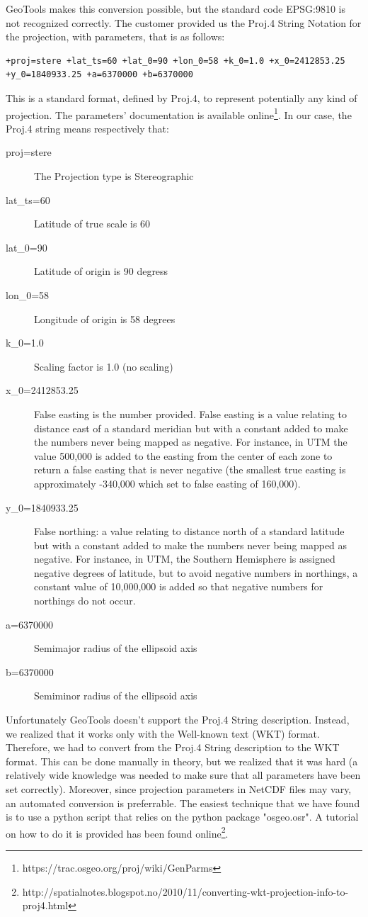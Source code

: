 \documentclass[11pt,a4paper,titlepage,oneside]{report}
\begin{document}
GeoTools makes this conversion possible, but the standard code EPSG:9810 is not recognized correctly. 
The customer provided us the Proj.4 String Notation for the projection, with parameters, that is as follows:
\begin{lstlisting}
+proj=stere +lat_ts=60 +lat_0=90 +lon_0=58 +k_0=1.0 +x_0=2412853.25 +y_0=1840933.25 +a=6370000 +b=6370000
\end{lstlisting}
This is a standard format, defined by Proj.4, to represent potentially any kind of projection. The parameters' documentation is available online\footnote{https://trac.osgeo.org/proj/wiki/GenParms}. In our case, the Proj.4 string means respectively that:
\begin{description}
\item[proj=stere] The Projection type is Stereographic
\item[lat\_ts=60] Latitude of true scale is 60
\item[lat\_0=90] Latitude of origin is 90 degress
\item[lon\_0=58] Longitude of origin is 58 degrees
\item[k\_0=1.0] Scaling factor is 1.0 (no scaling)
\item[x\_0=2412853.25] False easting is the number provided. False easting is a value relating to distance east of a standard meridian but with a constant added to make the numbers never being mapped as negative. For instance, in UTM the value 500,000 is added to the easting from the center of each zone to return a false easting that is never negative (the smallest true easting is approximately -340,000 which set to false easting of 160,000).
\item[y\_0=1840933.25] False northing: a value relating to distance north of a standard latitude but with a constant added to make the numbers never being mapped as negative. For instance, in UTM, the Southern Hemisphere is assigned negative degrees of latitude, but to avoid negative numbers in northings, a constant value of 10,000,000 is added so that negative numbers for northings do not occur.
\item[a=6370000] Semimajor radius of the ellipsoid axis
\item[b=6370000] Semiminor radius of the ellipsoid axis
\end{description}

Unfortunately GeoTools doesn't support the Proj.4 String description. Instead, we realized that it works only with the Well-known text (\gls{WKT}) format.
Therefore, we had to convert from the Proj.4 String description to the WKT format.
This can be done manually in theory, but we realized that it was hard (a relatively wide knowledge was needed to make sure that all parameters have been set correctly). Moreover, since projection parameters in NetCDF files may vary, an automated conversion is preferrable.
The easiest technique that we have found is to use a python script that relies on the python package "osgeo.osr". A tutorial on how to do it is provided has been found online\footnote{http://spatialnotes.blogspot.no/2010/11/converting-wkt-projection-info-to-proj4.html}.
\end{document}
